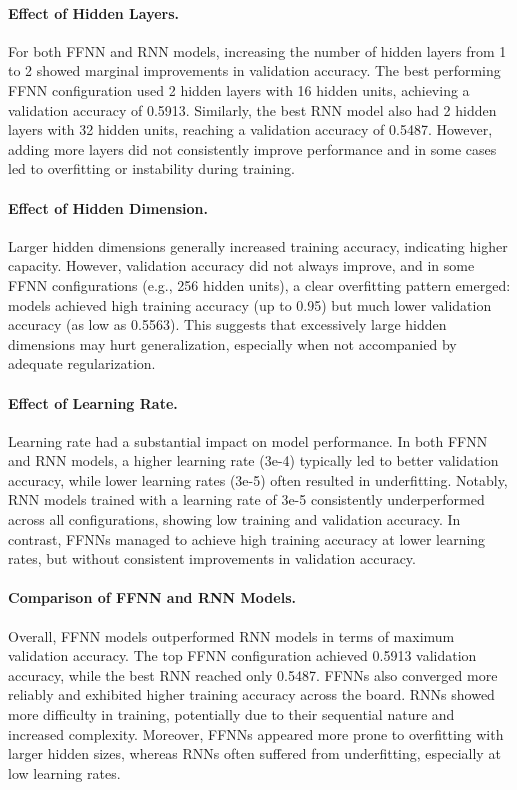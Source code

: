 \documentclass[a4paper]{article}
\begin{document}
\paragraph{Effect of Hidden Layers.} 
For both FFNN and RNN models, increasing the number of hidden layers from 1 to 2 showed marginal improvements in validation accuracy. The best performing FFNN configuration used 2 hidden layers with 16 hidden units, achieving a validation accuracy of 0.5913. Similarly, the best RNN model also had 2 hidden layers with 32 hidden units, reaching a validation accuracy of 0.5487. However, adding more layers did not consistently improve performance and in some cases led to overfitting or instability during training.


\paragraph{Effect of Hidden Dimension.}
Larger hidden dimensions generally increased training accuracy, indicating higher capacity. However, validation accuracy did not always improve, and in some FFNN configurations (e.g., 256 hidden units), a clear overfitting pattern emerged: models achieved high training accuracy (up to 0.95) but much lower validation accuracy (as low as 0.5563). This suggests that excessively large hidden dimensions may hurt generalization, especially when not accompanied by adequate regularization.


\paragraph{Effect of Learning Rate.}
Learning rate had a substantial impact on model performance. In both FFNN and RNN models, a higher learning rate (3e-4) typically led to better validation accuracy, while lower learning rates (3e-5) often resulted in underfitting. Notably, RNN models trained with a learning rate of 3e-5 consistently underperformed across all configurations, showing low training and validation accuracy. In contrast, FFNNs managed to achieve high training accuracy at lower learning rates, but without consistent improvements in validation accuracy.

\paragraph{Comparison of FFNN and RNN Models.}
Overall, FFNN models outperformed RNN models in terms of maximum validation accuracy. The top FFNN configuration achieved 0.5913 validation accuracy, while the best RNN reached only 0.5487. FFNNs also converged more reliably and exhibited higher training accuracy across the board. RNNs showed more difficulty in training, potentially due to their sequential nature and increased complexity. Moreover, FFNNs appeared more prone to overfitting with larger hidden sizes, whereas RNNs often suffered from underfitting, especially at low learning rates.
\end{document}
